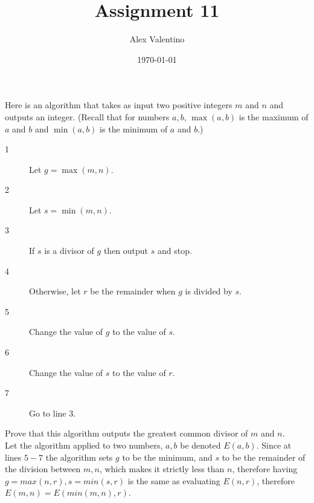 \documentclass[12pt, letterpaper]{article}
\date{\today}
\author{Alex Valentino}
\title{Assignment 11}
\begin{document}
	Here is an algorithm that takes as input two positive integers $m$ and $n$ and
outputs an integer.  (Recall that for numbers $a,b$, $\max(a,b)$ is the maximum of $a$
and $b$ and $\min(a,b)$ is the minimum of $a$ and $b$.)
\begin{description}
\item[1] Let $g=\max(m,n)$.
\item[2] Let $s=\min(m,n)$.
\item[3] If $s$ is a divisor of $g$ then output $s$ and stop.
\item[4] Otherwise, let $r$ be the remainder when $g$ is divided by $s$.
\item[5] Change the value of $g$ to the value of $s$.
\item[6] Change the value of $s$ to the value of  $r$.
\item[7] Go to line 3.
\end{description}
Prove that this algorithm outputs the greatest common divisor of $m$ and $n$.\\


Let the algorithm applied to two numbers, $a,b$ be denoted $E(a,b).$  Since at lines $5-7$ the algorithm sets $g$ to be the minimum, and $s$ to be the remainder of the division between $m,n$, which makes it strictly less than $n$, therefore having $g=max(n,r), s = min(s,r)$ is the same as evaluating $E(n,r)$, therefore $E(m,n) = E(min(m,n),r)$.\\
\end{document}
